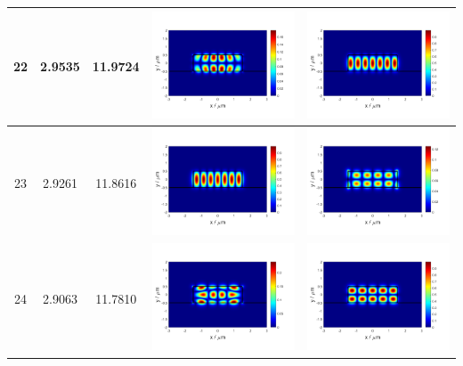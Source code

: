 \documentclass{assignment}
\begin{document}
\begin{sol}
\begin{itemize}
\begin{longtable}[c]{|c|c|c|c|c|}
            22 & 2.9535 & 11.9724 & \includegraphics[width=.3\columnwidth]{Assignment-2-mode-22-Ex.png} & \includegraphics[width=.3\columnwidth]{Assignment-2-mode-22-Ey.png} \\ \hline
            23 & 2.9261 & 11.8616 & \includegraphics[width=.3\columnwidth]{Assignment-2-mode-23-Ex.png} & \includegraphics[width=.3\columnwidth]{Assignment-2-mode-23-Ey.png} \\ \hline
            24 & 2.9063 & 11.7810 & \includegraphics[width=.3\columnwidth]{Assignment-2-mode-24-Ex.png} & \includegraphics[width=.3\columnwidth]{Assignment-2-mode-24-Ey.png} \\ \hline

\end{longtable}
\end{itemize}
\end{sol}
\end{document}

